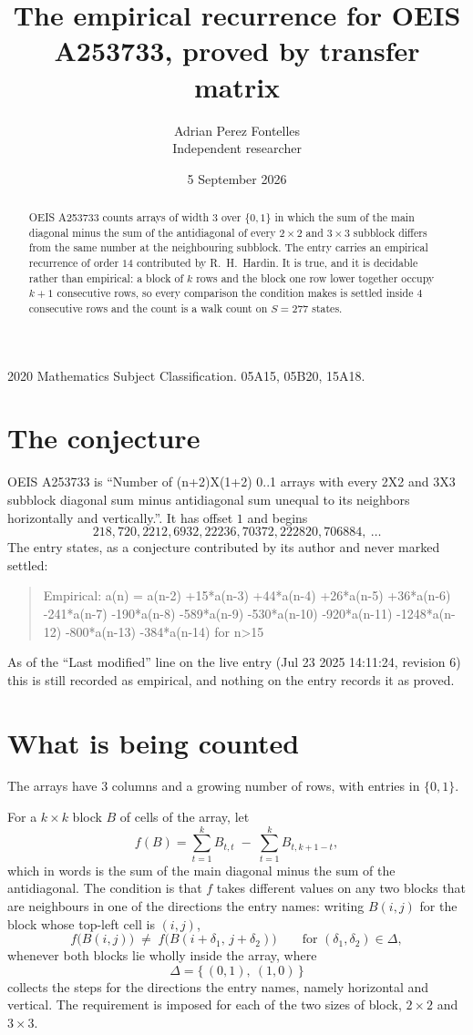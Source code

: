 \documentclass[11pt,a4paper]{article}
\title{The empirical recurrence for OEIS A253733, proved by transfer matrix}
\author{Adrian Perez Fontelles\\ \small Independent researcher}
\date{5 September 2026}
\theoremstyle{plain}
\theoremstyle{definition}
\begin{document}
\maketitle

\begin{abstract}
OEIS A253733 counts arrays of width $3$ over $\{0,1\}$ in which the sum of the main diagonal minus the sum of the antidiagonal of every $2\times2$ and $3\times3$ subblock differs from the same number at the neighbouring subblock. The entry carries an
empirical recurrence of order $14$ contributed by R.~H.~Hardin. It is true, and it is
decidable rather than empirical: a block of $k$ rows and the block one row lower together
occupy $k+1$ consecutive rows, so every comparison the condition makes is settled inside
$4$ consecutive rows and the count is a walk count on $S=277$ states.
\end{abstract}

\noindent\small 2020 Mathematics Subject Classification. 05A15, 05B20, 15A18.\normalsize

\section{The conjecture}

OEIS A253733 is ``Number of (n+2)X(1+2) 0..1 arrays with every 2X2 and 3X3 subblock diagonal sum minus antidiagonal sum unequal to its neighbors horizontally and vertically.''. It has offset $1$ and begins
\[
218, 720, 2212, 6932, 22236, 70372, 222820, 706884,\ \dots
\]
The entry states, as a conjecture contributed by its author and never marked settled:
\begin{quote}
Empirical: a(n) = a(n-2) +15*a(n-3) +44*a(n-4) +26*a(n-5) +36*a(n-6) -241*a(n-7) -190*a(n-8) -589*a(n-9) -530*a(n-10) -920*a(n-11) -1248*a(n-12) -800*a(n-13) -384*a(n-14) for n>15
\end{quote}
As of the ``Last modified'' line on the live entry (Jul 23 2025 14:11:24, revision 6) this is still
recorded as empirical, and nothing on the entry records it as proved.

\section{What is being counted}

The arrays have $3$ columns and a growing number of rows, with entries in $\{0,1\}$.

For a $k\times k$ block $B$ of cells of the array, let
\[
f(B)=\sum_{t=1}^{k}B_{t,t}\;-\;\sum_{t=1}^{k}B_{t,k+1-t} ,
\]
which in words is the sum of the main diagonal minus the sum of the antidiagonal. The condition is that $f$ takes different values on any two blocks that
are neighbours in one of the directions the entry names: writing $B(i,j)$ for the block whose
top-left cell is $(i,j)$,
\[
f\bigl(B(i,j)\bigr)\;\neq\;f\bigl(B(i+\delta_1,\,j+\delta_2)\bigr)
\qquad\text{for }(\delta_1,\delta_2)\in\Delta,
\]
whenever both blocks lie wholly inside the array, where
\[
\Delta=\{\,(0,1),\ (1,0)\,\}
\]
collects the steps for the directions the entry names, namely horizontal and vertical. The
requirement is imposed for each of the two sizes of block, $2\times2$ and $3\times3$.
\end{document}
